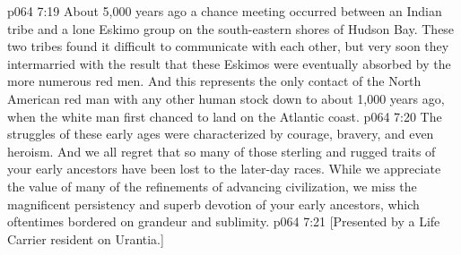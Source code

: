 \vs p064 7:19 About 5,000 years ago a chance meeting occurred between an Indian tribe and a lone Eskimo group on the south\hyp{}eastern shores of Hudson Bay. These two tribes found it difficult to communicate with each other, but very soon they intermarried with the result that these Eskimos were eventually absorbed by the more numerous red men. And this represents the only contact of the North American red man with any other human stock down to about 1,000 years ago, when the white man first chanced to land on the Atlantic coast.
\vs p064 7:20 \pc The struggles of these early ages were characterized by courage, bravery, and even heroism. And we all regret that so many of those sterling and rugged traits of your early ancestors have been lost to the later\hyp{}day races. While we appreciate the value of many of the refinements of advancing civilization, we miss the magnificent persistency and superb devotion of your early ancestors, which oftentimes bordered on grandeur and sublimity.
\vsetoff
\vs p064 7:21 [Presented by a Life Carrier resident on Urantia.]
\quizlink
